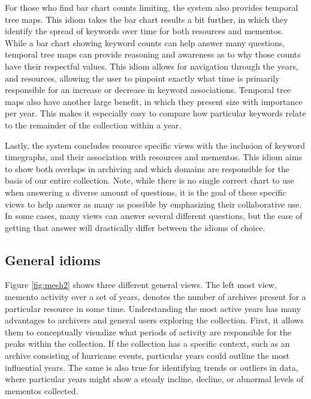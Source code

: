 \documentclass[10pt,journal,compsoc]{IEEEtran}
\begin{document}
For those who find bar chart counts limiting, the system also provides temporal tree maps. This idiom takes the bar chart results a bit further, in which they identify the spread of keywords over time for both resources and mementos. While a bar chart showing keyword counts can help answer many questions, temporal tree maps can provide reasoning and awareness as to why those counts have their respectful values. This idiom allows for navigation through the years, and resources, allowing the user to pinpoint exactly what time is primarily responsible for an increase or decrease in keyword associations. Temporal tree maps also have another large benefit, in which they present size with importance per year. This makes it especially easy to compare how particular keywords relate to the remainder of the collection within a year. \par

Lastly, the system concludes resource specific views with the inclusion of keyword timegraphs, and their association with resources and mementos. This idiom aims to show both overlaps in archiving and which domains are responsible for the basis of our entire collection. Note, while there is no single correct chart to use when answering a diverse amount of questions, it is the goal of these specific views to help answer as many as possible by emphasizing their collaborative use. In some cases, many views can answer several different questions, but the ease of getting that answer will drastically differ between the idioms of choice. \par

\subsection{General idioms}
Figure \ref{fig:mesh2} shows three different general views. The left most view, memento activity over a set of years, denotes the number of archives present for a particular resource in some time. Understanding the most active years has many advantages to archivers and general users exploring the collection. First, it allows them to conceptually visualize what periods of activity are responsible for the peaks within the collection. If the collection has a specific context, such as an archive consisting of hurricane events, particular years could outline the most influential years. The same is also true for identifying trends or outliers in data, where particular years might show a steady incline, decline, or abnormal levels of mementos collected. \par
\end{document}
